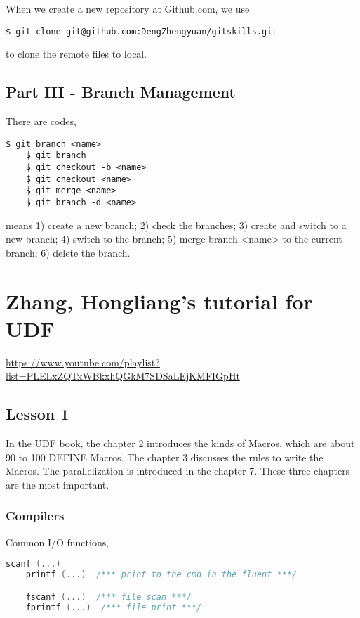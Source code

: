 \documentclass[11pt]{report}
\begin{document}
When we create a new repository at Github.com, we use
\begin{lstlisting}[basicstyle=\small\conso]
    $ git clone git@github.com:DengZhengyuan/gitskills.git
\end{lstlisting}
to clone the remote files to local.

\section{Part III - Branch Management}
There are codes,
\begin{lstlisting}[basicstyle=\small\conso]
    $ git branch <name>
    $ git branch
    $ git checkout -b <name> 
    $ git checkout <name> 
    $ git merge <name> 
    $ git branch -d <name>
\end{lstlisting}
means 1) create a new branch; 
2) check the branches; 
3) create and switch to a new branch; 
4) switch to the branch; 
5) merge branch <name> to the current branch; 
6) delete the branch. 


\chapter{Zhang, Hongliang's tutorial for UDF}
\url{https://www.youtube.com/playlist?list=PLELxZQTxWBkxhQGkM7SDSaLEjKMFIGpHt}
\section{Lesson 1}
In the UDF book, the chapter 2 introduces the kinds of Macros, which are about 90 to 100 DEFINE Macros. 
The chapter 3 discusses the rules to write the Macros. 
The parallelization is introduced in the chapter 7. 
These three chapters are the most important.

\subsection{Compilers}
Common I/O functions,
\begin{lstlisting}[basicstyle=\small\conso, language=C]
    scanf (...)
    printf (...)  /*** print to the cmd in the fluent ***/

    fscanf (...)  /*** file scan ***/
    fprintf (...)  /*** file print ***/
\end{lstlisting}
\end{document}

